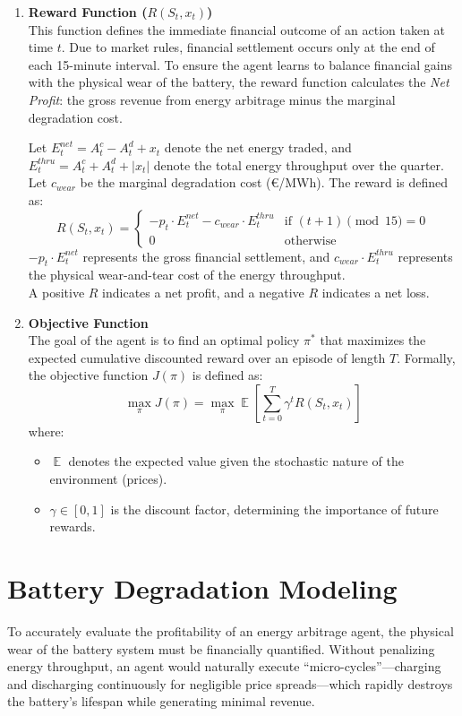 \begin{enumerate}
    \item \textbf{Reward Function ($R(S_t, x_t)$)} \\
    This function defines the immediate financial outcome of an action taken at time $t$. Due to market rules, financial settlement occurs only at the end of each 15-minute interval. To ensure the agent learns to balance financial gains with the physical wear of the battery, the reward function calculates the \textit{Net Profit}: the gross revenue from energy arbitrage minus the marginal degradation cost.
    
     Let $E^{net}_t = A^c_{t} - A^d_{t} + x_t$ denote the net energy traded, and $E^{thru}_t = A^c_{t} + A^d_{t} + |x_t|$ denote the total energy throughput over the quarter. Let $c_{wear}$ be the marginal degradation cost (€/MWh). The reward is defined as:
    \[
    R(S_t, x_t) = 
    \begin{cases} 
        -p_t \cdot E^{net}_t - c_{wear} \cdot E^{thru}_t & \text{if } (t+1) \pmod{15} = 0 \\
        0 & \text{otherwise}
    \end{cases}
    \]
    $-p_t \cdot E^{net}_t$ represents the gross financial settlement, and  $c_{wear} \cdot E^{thru}_t$ represents the physical wear-and-tear cost of the energy throughput.  \\
    A positive $R$ indicates a net profit, and a negative $R$ indicates a net loss.
    
    \item \textbf{Objective Function} \\
    The goal of the agent is to find an optimal policy $\pi^*$ that maximizes the expected cumulative discounted reward over an episode of length $T$. Formally, the objective function $J(\pi)$ is defined as:
    \[
        \max_{\pi} J(\pi) = \max_{\pi} \mathop{\mathbb{E}} \left[ \sum_{t=0}^{T} \gamma^t R(S_t, x_t) \right]
    \]
    where:
    \begin{itemize}
        \item $\mathop{\mathbb{E}}$ denotes the expected value given the stochastic nature of the environment (prices).
        \item $\gamma \in [0, 1]$ is the discount factor, determining the importance of future rewards.
    \end{itemize}
\end{enumerate}

\section{Battery Degradation Modeling}
To accurately evaluate the profitability of an energy arbitrage agent, the physical wear of the battery system must be financially quantified. Without penalizing energy throughput, an agent would naturally execute ``micro-cycles''---charging and discharging continuously for negligible price spreads---which rapidly destroys the battery's lifespan while generating minimal revenue.

